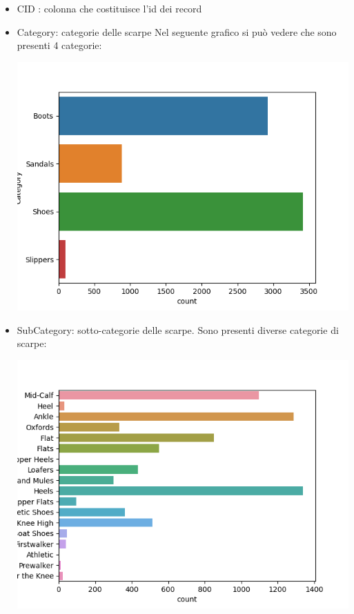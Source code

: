 \documentclass[a4paper, 11pt, oneside]{report}
\begin{document}
                \begin{itemize}
                    \item CID : colonna che costituisce l'id dei record
                    \item Category: categorie delle scarpe
                    Nel seguente grafico si può vedere che sono presenti 4 categorie:
                    \begin{center}
                        \includegraphics[scale=0.4]{CategoryShoes}
                    \end{center}
                    \item SubCategory: sotto-categorie delle scarpe.
                    Sono presenti diverse categorie di scarpe:
                    \begin{center}
                        \includegraphics[scale=0.4]{SubCategoryShoes}

\end{center}
\end{itemize}
\end{document}
